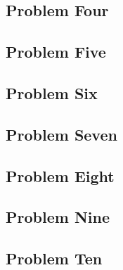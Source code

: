 \documentclass[12pt]{article}
\begin{document}
	
	\subsection{Problem Four}
	\begin{center} \end{center}

	\subsection{Problem Five}
	\begin{center} \end{center}


	\subsection{Problem Six}
	\begin{center} \end{center}

	\subsection{Problem Seven}
	\begin{center} \end{center}

	\subsection{Problem Eight}
	\begin{center} \end{center}

	\subsection{Problem Nine}
	\begin{center} \end{center}

	\subsection{Problem Ten}
	\begin{center} \end{center}


	
\end{document}
